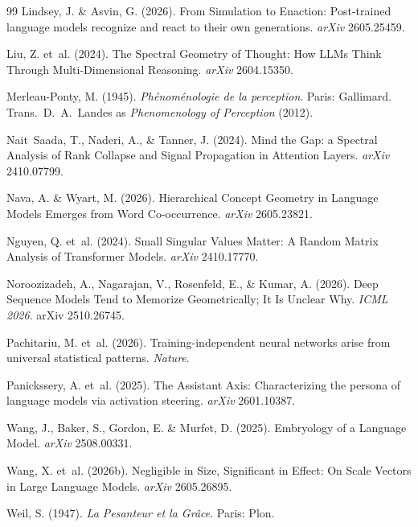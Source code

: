 \documentclass[12pt]{article}
\begin{document}
\begin{thebibliography}{99}
Lindsey, J. \& Asvin, G. (2026).
From Simulation to Enaction: Post-trained language models recognize and react to their own generations.
\textit{arXiv} 2605.25459.

Liu, Z. et~al. (2024).
The Spectral Geometry of Thought: How LLMs Think Through Multi-Dimensional Reasoning.
\textit{arXiv} 2604.15350.

Merleau-Ponty, M. (1945).
\textit{Ph\'{e}nom\'{e}nologie de la perception}.
Paris: Gallimard.
Trans.\ D.~A.\ Landes as \textit{Phenomenology of Perception} (2012).

Nait~Saada, T., Naderi, A., \& Tanner, J. (2024).
Mind the Gap: a Spectral Analysis of Rank Collapse and Signal Propagation in Attention Layers.
\textit{arXiv} 2410.07799.

Nava, A. \& Wyart, M. (2026).
Hierarchical Concept Geometry in Language Models Emerges from Word Co-occurrence.
\textit{arXiv} 2605.23821.

Nguyen, Q. et~al. (2024).
Small Singular Values Matter: A Random Matrix Analysis of Transformer Models.
\textit{arXiv} 2410.17770.

Noroozizadeh, A., Nagarajan, V., Rosenfeld, E., \& Kumar, A. (2026).
Deep Sequence Models Tend to Memorize Geometrically; It Is Unclear Why.
\textit{ICML 2026}. arXiv 2510.26745.

Pachitariu, M. et~al. (2026).
Training-independent neural networks arise from universal statistical patterns.
\textit{Nature}.

Panickssery, A. et~al. (2025).
The Assistant Axis: Characterizing the persona of language models via activation steering.
\textit{arXiv} 2601.10387.

Wang, J., Baker, S., Gordon, E. \& Murfet, D. (2025).
Embryology of a Language Model.
\textit{arXiv} 2508.00331.

Wang, X. et~al. (2026b).
Negligible in Size, Significant in Effect: On Scale Vectors in Large Language Models.
\textit{arXiv} 2605.26895.

Weil, S. (1947).
\textit{La Pesanteur et la Gr\^{a}ce}.
Paris: Plon.


\end{thebibliography}
\end{document}
